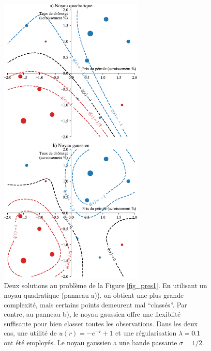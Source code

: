 \begin{figure}[p]
  \centering
  \includegraphics[width=0.65\textwidth]{../experiments/fig/pres/pres10_fr.pdf}
  \caption[Problème XOR]{Deux solutions au problème de la Figure \ref{fig_pres1}. En
    utilisant un noyau quadratique (panneau a)), on obtient une plus grande complexité,
    mais certains points demeurent mal ``classés''. Par contre, au panneau b), le noyau
    gaussien offre une flexiblité suffisante pour bien classer toutes les
    observations. Dans les deux cas, une utilité de $u(r) = -e^{-r}+1$ et une
    régularisation $\lambda=0.1$ ont été employés. Le noyau gaussien a une bande passante
    $\sigma = 1/2$. }
  \label{fig_yeah}
\end{figure}









